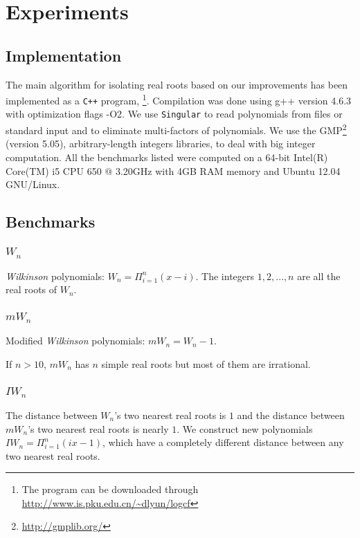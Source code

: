 
\section{Experiments }
\subsection{Implementation}
The main algorithm for isolating real roots based on our improvements has been implemented as a \texttt{C++} program, \froot \footnote{The program can be downloaded through \url{http://www.is.pku.edu.cn/~dlyun/logcf}}. Compilation was done using g++ version 4.6.3 with optimization flags -O2.
We use {\tt Singular} \cite{singular} to read polynomials from files or standard input and to eliminate multi-factors of polynomials. We use the GMP\footnote{ \url{http://gmplib.org/}}
(version 5.05), arbitrary-length integers libraries, to deal with big integer computation.
All the benchmarks listed were computed on a 64-bit Intel(R) Core(TM) i5 CPU 650 @ 3.20GHz with 4GB RAM memory and Ubuntu 12.04 GNU/Linux.

\subsection{Benchmarks }
 \subsubsection{$W_n$}
 {\it Wilkinson} polynomials: $W_n=\Pi_{i=1}^n(x-i)$. The integers $1,2,\ldots,n $ are  all the real roots of $W_n$.
  \subsubsection{$mW_n$}
  Modified {\it Wilkinson} polynomials: $mW_n=W_n-1$.

  If $n>10$, $mW_n$ has $n$ simple real roots but most of them are irrational.
 \subsubsection{$IW_n$}
 The distance between  $W_n$'s two  nearest real roots  is  $1$ and the distance between $mW_n$'s two nearest real roots  is nearly $1$. %
 We construct new polynomials $IW_n=\Pi_{i=1}^n(ix-1)$, which have a completely different distance between any two nearest real roots.
